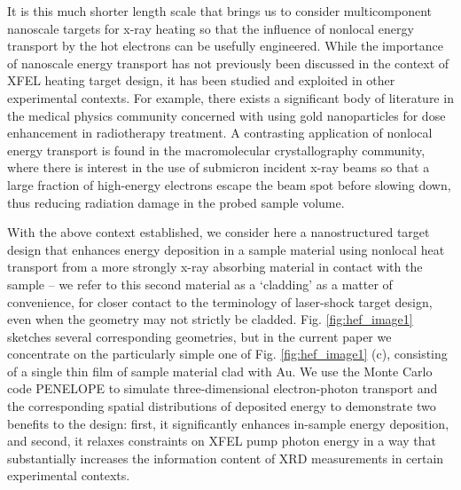 It is this much shorter length scale that brings us to consider
multicomponent nanoscale targets for x-ray heating so that the influence
of nonlocal energy transport by the hot electrons can be usefully
engineered. While the importance of nanoscale energy transport has not
previously been discussed in the context of XFEL heating target design,
it has been studied and exploited in other experimental contexts. For
example, there exists a significant body of literature in the medical
physics community concerned with using gold nanoparticles for dose
enhancement in radiotherapy treatment. \cite{lee2012geometry, leung2011irradiation} A contrasting
application of nonlocal energy transport is found in the macromolecular
crystallography community, where there is interest in the use of
submicron incident x-ray beams so that a large fraction of high-energy
electrons escape the beam spot before slowing down, thus reducing
radiation damage in the probed sample volume. \cite{stern2009reducing, finfrock2013mitigation, finfrock2010spatial, nave2005towards, sanishvili2011radiation}

With the above context established, we consider here a nanostructured
target design that enhances energy deposition in a sample material using
nonlocal heat transport from a more strongly x-ray absorbing material in
contact with the sample -- we refer to this second material as a
`cladding' as a matter of convenience, for closer contact to the
terminology of laser-shock target design, even when the geometry may not
strictly be cladded. Fig. \ref{fig:hef_image1} sketches several corresponding geometries,
but in the current paper we concentrate on the particularly simple one
of Fig. \ref{fig:hef_image1} (c), consisting of a single thin film of sample material clad
with Au. We use the Monte Carlo code PENELOPE to simulate
three-dimensional electron-photon transport and the corresponding
spatial distributions of deposited energy to demonstrate two benefits to
the design: first, it significantly enhances in-sample energy
deposition, and second, it relaxes constraints on XFEL pump photon
energy in a way that substantially increases the information content of
XRD measurements in certain experimental contexts.

